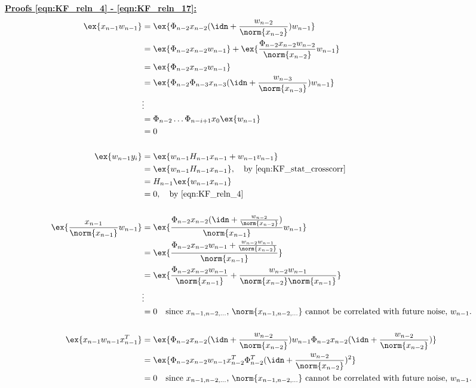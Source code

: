 \newpage
\underline{\textbf{Proofs \ref{eqn:KF_reln_4} - \ref{eqn:KF_reln_17}:}}
\\
\begin{align}
\ex{x_{n-1} w_{n-1}} & = \ex{\Phi_{n-2}x_{n-2}(\idn + \frac{w_{n-2}}{\norm{x_{n-2}}}) w_{n-1}} \\
& = \ex{\Phi_{n-2}x_{n-2}w_{n-1}} +\ex{ \frac{\Phi_{n-2}x_{n-2} w_{n-2}}{\norm{x_{n-2}}} w_{n-1}} \\
& = \ex{\Phi_{n-2}x_{n-2}w_{n-1}} \\
& = \ex{\Phi_{n-2}\Phi_{n-3}x_{n-3}(\idn + \frac{w_{n-3}}{\norm{x_{n-3}}})w_{n-1}} \\
& \vdots \\
& = \Phi_{n-2}\dots\Phi_{n-i+1}x_0\ex{w_{n-1}} \\
&= 0 \\
\nonumber \\ 
\ex{w_{n-1} y_i} &= \ex{w_{n-1}  H_{n-1} x_{n-1} + w_{n-1}v_{n-1}}  \\
 &= \ex{w_{n-1}  H_{n-1} x_{n-1}}, \quad\text{by \ref{eqn:KF_stat_crosscorr} } \\ 
 &= H_{n-1} \ex{w_{n-1} x_{n-1}} \\
 &= 0, \quad\text{by \ref{eqn:KF_reln_4}} \\
\nonumber \\ 
\ex{\frac{x_{n-1}}{\norm{x_{n-1}}}w_{n-1}} & = \ex{\frac{\Phi_{n-2}x_{n-2}(\idn + \frac{w_{n-2}}{\norm{x_{n-2}}})}{\norm{x_{n-1}}}w_{n-1}} \\
& = \ex{\frac{\Phi_{n-2}x_{n-2}w_{n-1} + \frac{w_{n-2}w_{n-1}}{\norm{x_{n-2}}}}{\norm{x_{n-1}}}} \\
& = \ex{\frac{\Phi_{n-2}x_{n-2}w_{n-1}}{\norm{x_{n-1}}} + \frac{w_{n-2}w_{n-1}}{\norm{x_{n-2}}\norm{x_{n-1}}}} \\
&\vdots \\
&= 0 \quad \text{since $x_{n-1, n-2, \dots}$, $\norm{x_{n-1,n-2, \dots}}$ cannot be correlated with future  noise, $w_{n-1}$.}\\
\nonumber \\ 
\ex{x_{n-1} w_{n-1} x_{n-1}^T} &= \ex{\Phi_{n-2}x_{n-2}(\idn + \frac{w_{n-2}}{\norm{x_{n-2}}}) w_{n-1} \Phi_{n-2}x_{n-2}(\idn + \frac{w_{n-2}}{\norm{x_{n-2}}})} \\
&= \ex{\Phi_{n-2}x_{n-2} w_{n-1} x_{n-2}^T\Phi_{n-2}^T(\idn + \frac{w_{n-2}}{\norm{x_{n-2}}})^2} \\
&= 0 \quad \text{since $x_{n-1, n-2, \dots}$, $\norm{x_{n-1,n-2, \dots}}$ cannot be correlated with future  noise, $w_{n-1}$.}
\end{align}

